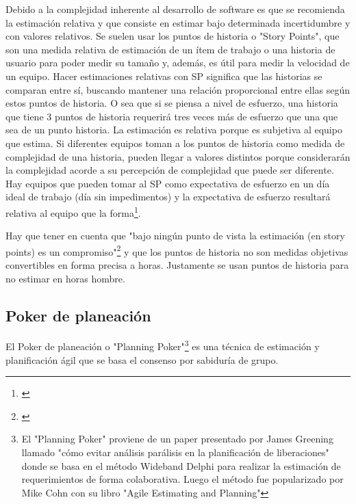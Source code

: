 Debido a la complejidad inherente al desarrollo de software es que se recomienda la estimación relativa y que consiste en estimar bajo determinada incertidumbre y con valores relativos. Se suelen usar los puntos de historia o "Story Points", que son una medida relativa de estimación de un ítem de trabajo o una historia de usuario para poder medir su tamaño y, además, es útil para medir la velocidad de un equipo. Hacer estimaciones relativas con SP significa que las historias se comparan entre sí, buscando mantener una relación proporcional entre ellas según estos puntos de historia. O sea que si se piensa a nivel de esfuerzo, una historia que tiene 3 puntos de historia requerirá tres veces más de esfuerzo que una que sea de un punto historia.
La estimación es relativa porque es subjetiva al equipo que estima. Si diferentes equipos toman a los puntos de historia como medida de complejidad de una historia, pueden llegar a valores distintos porque considerarán la complejidad acorde a su percepción de complejidad que puede ser diferente. Hay equipos que pueden tomar al SP como expectativa de esfuerzo en un día ideal de trabajo (día sin impedimentos) y la expectativa de esfuerzo resultará relativa al equipo que la forma\footnote{\cite{Cohn-2004}}.

Hay que tener en cuenta que "bajo ningún punto de vista la estimación (en story points) es un compromiso"\footnote{\cite{UNTREF-2014}} y que los puntos de historia no son medidas objetivas convertibles en forma precisa a horas. Justamente se usan puntos de historia para no estimar en horas hombre.

\subsection{Poker de planeación}

El Poker de planeación o "Planning Poker"\footnote{El "Planning Poker" proviene de un paper presentado por James Greening llamado "cómo evitar análisis parálisis en la planificación de liberaciones"\cite{James-Grenning-2002} donde se basa en el método Wideband Delphi para realizar la estimación de requerimientos de forma colaborativa. Luego el método fue popularizado por Mike Cohn con su libro "Agile Estimating and Planning"\cite{Cohn-2005}} es una técnica de estimación y planificación ágil que se basa el consenso por sabiduría de grupo. 

